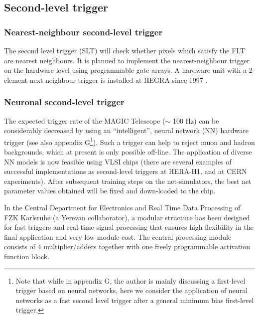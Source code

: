 \subsection{Second-level trigger}

\subsubsection{Nearest-neighbour second-level trigger}


\medskip The second level trigger (SLT) will check whether pixels which
satisfy the FLT are nearest neighbours. It is planned to implement the
nearest-neighbour trigger on the hardware level using programmable gate
arrays. A hardware unit with a 2-element next neighbour trigger is installed
at HEGRA since 1997 \cite{bullian:97}.

\subsubsection{Neuronal second-level trigger}


\medskip The expected trigger rate of the MAGIC Telescope ($\sim$ 100 Hz) can be
considerably decreased by using an ``intelligent'', neural network (NN)
hardware trigger (see also appendix G\footnote{Note that while in appendix G,
the author is mainly discussing a first-level trigger based on neural networks, 
here we consider the application of neural networks as a
fast second level trigger after a general minimum bias first-level trigger.}). 
Such a trigger can help to  reject muon and
hadron backgrounds, which at present is only possible off-line. The
application of diverse NN models is now feasible using VLSI chips (there are
several examples of successful implementations as second-level triggers at
HERA-H1, and at CERN experiments). After subsequent training steps on the
net-simulators, the best net parameter values obtained will be fixed and
down-loaded to the chip.

In the Central Department for Electronics and Real Time Data Processing of
FZK Karlsruhe (a Yerevan collaborator), a modular structure has been
designed for fast triggers and real-time signal processing that ensures high
flexibility in the final application and very low module cost. The central
processing module consists of 4 multiplier/adders together with one freely
programmable activation function block.

